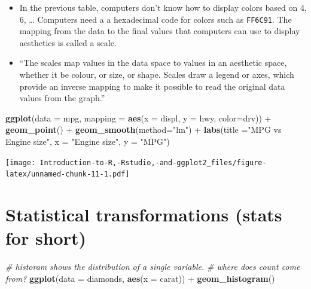 \documentclass[]{book}
\newenvironment{Shaded}{\begin{snugshade}}{\end{snugshade}}
\newcommand{\KeywordTok}[1]{\textcolor[rgb]{0.13,0.29,0.53}{\textbf{{#1}}}}
\newcommand{\DataTypeTok}[1]{\textcolor[rgb]{0.13,0.29,0.53}{{#1}}}
\newcommand{\StringTok}[1]{\textcolor[rgb]{0.31,0.60,0.02}{{#1}}}
\newcommand{\CommentTok}[1]{\textcolor[rgb]{0.56,0.35,0.01}{\textit{{#1}}}}
\newcommand{\NormalTok}[1]{{#1}}
\begin{document}
\begin{itemize}
\item
  In the previous table, computers don't know how to display colors
  based on 4, 6, \ldots{} Computers need a a hexadecimal code for colors
  such as \texttt{FF6C91}. The mapping from the data to the final values
  that computers can use to display aesthetics is called a scale.
\item
  ``The scales map values in the data space to values in an aesthetic
  space, whether it be colour, or size, or shape. Scales draw a legend
  or axes, which provide an inverse mapping to make it possible to read
  the original data values from the graph.'' \citep{ggplot2}
\end{itemize}

\begin{Shaded}
\begin{Highlighting}[]
\KeywordTok{ggplot}\NormalTok{(}\DataTypeTok{data =} \NormalTok{mpg, }\DataTypeTok{mapping =} \KeywordTok{aes}\NormalTok{(}\DataTypeTok{x =} \NormalTok{displ, }\DataTypeTok{y =} \NormalTok{hwy, }\DataTypeTok{color=}\NormalTok{drv)) +}\StringTok{ }\KeywordTok{geom_point}\NormalTok{() +}\StringTok{ }\KeywordTok{geom_smooth}\NormalTok{(}\DataTypeTok{method=}\StringTok{"lm"}\NormalTok{) +}\StringTok{ }\KeywordTok{labs}\NormalTok{(}\DataTypeTok{title =}\StringTok{"MPG vs Engine size"}\NormalTok{, }\DataTypeTok{x =} \StringTok{"Engine size"}\NormalTok{, }\DataTypeTok{y =} \StringTok{"MPG"}\NormalTok{)}
\end{Highlighting}
\end{Shaded}

\texttt{[image: Introduction-to-R,-Rstudio,-and-ggplot2\_files/figure-latex/unnamed-chunk-11-1.pdf]}

\section{\texorpdfstring{Statistical transformations (\textbf{stats} for
short)}{Statistical transformations (stats for short)}}\label{statistical-transformations-stats-for-short}

\begin{Shaded}
\begin{Highlighting}[]
\CommentTok{# historam shows the distribution of a single variable. }
\CommentTok{# where does count come from? }
\KeywordTok{ggplot}\NormalTok{(}\DataTypeTok{data =} \NormalTok{diamonds, }\KeywordTok{aes}\NormalTok{(}\DataTypeTok{x =} \NormalTok{carat)) +}\StringTok{ }\KeywordTok{geom_histogram}\NormalTok{()}
\end{Highlighting}
\end{Shaded}
\end{document}
